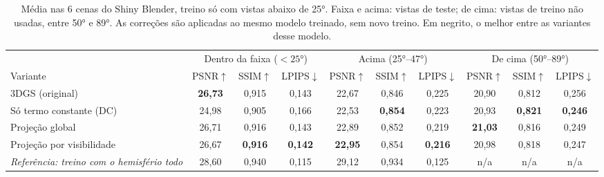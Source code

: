 \begin{table}[t]
\centering
\caption{Média nas 6 cenas do Shiny Blender, treino só com vistas abaixo de 25°. Faixa e acima: vistas de teste; de cima: vistas de treino não usadas, entre 50° e 89°. As correções são aplicadas ao mesmo modelo treinado, sem novo treino. Em negrito, o melhor entre as variantes desse modelo.}
\label{tab:principal25}
\begin{tabular}{l ccc ccc ccc}
\toprule
 & \multicolumn{3}{c}{Dentro da faixa ($<25$°)} & \multicolumn{3}{c}{Acima (25°--47°)} & \multicolumn{3}{c}{De cima (50°--89°)} \\
\cmidrule(lr){2-4}\cmidrule(lr){5-7}\cmidrule(lr){8-10}
Variante & PSNR$\uparrow$ & SSIM$\uparrow$ & LPIPS$\downarrow$ & PSNR$\uparrow$ & SSIM$\uparrow$ & LPIPS$\downarrow$ & PSNR$\uparrow$ & SSIM$\uparrow$ & LPIPS$\downarrow$ \\
\midrule
3DGS (original) & \textbf{26{,}73} & 0{,}915 & 0{,}143 & 22{,}67 & 0{,}846 & 0{,}225 & 20{,}90 & 0{,}812 & 0{,}256 \\
Só termo constante (DC) & 24{,}98 & 0{,}905 & 0{,}166 & 22{,}53 & \textbf{0{,}854} & 0{,}223 & 20{,}93 & \textbf{0{,}821} & \textbf{0{,}246} \\
Projeção global & 26{,}71 & 0{,}916 & 0{,}143 & 22{,}89 & 0{,}852 & 0{,}219 & \textbf{21{,}03} & 0{,}816 & 0{,}249 \\
Projeção por visibilidade & 26{,}67 & \textbf{0{,}916} & \textbf{0{,}142} & \textbf{22{,}95} & 0{,}854 & \textbf{0{,}216} & 20{,}98 & 0{,}818 & 0{,}247 \\
\midrule
\textit{Referência: treino com o hemisfério todo} & 28{,}60 & 0{,}940 & 0{,}115 & 29{,}12 & 0{,}934 & 0{,}125 & n/a & n/a & n/a \\
\bottomrule
\end{tabular}
\end{table}
